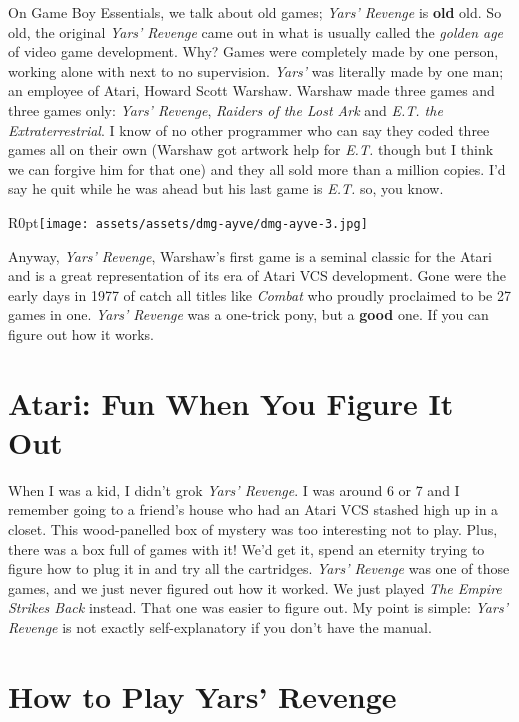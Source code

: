 \documentclass{book}
\begin{document}
On Game Boy Essentials, we talk about old games; \emph{Yars’ Revenge} is \textbf{old} old. So old, the original \emph{Yars’ Revenge} came out in what is usually called the \emph{golden age} of video game development. Why? Games were completely made by one person, working alone with next to no supervision. \emph{Yars’} was literally made by one man; an employee of Atari, Howard Scott Warshaw. Warshaw made three games and three games only: \emph{Yars’ Revenge}, \emph{Raiders of the Lost Ark} and \emph{E.T. the Extraterrestrial}. I know of no other programmer who can say they coded three games all on their own (Warshaw got artwork help for \emph{E.T.} though but I think we can forgive him for that one) and they all sold more than a million copies. I’d say he quit while he was ahead but his last game is \emph{E.T.} so, you know.\par
\begin{wrapfigure}{R}{0pt}{\texttt{[image: assets/assets/dmg-ayve/dmg-ayve-3.jpg]}}\end{wrapfigure}
Anyway, \emph{Yars’ Revenge}, Warshaw’s first game is a seminal classic for the Atari and is a great representation of its era of Atari VCS development. Gone were the early days in 1977 of catch all titles like \emph{Combat} who proudly proclaimed to be 27 games in one. \emph{Yars’ Revenge} was a one-trick pony, but a \textbf{good} one. If you can figure out how it works.\par
\FloatBarrier\section*{Atari: Fun When You Figure It Out}
When I was a kid, I didn’t grok \emph{Yars’ Revenge}. I was around 6 or 7 and I remember going to a friend’s house who had an Atari VCS stashed high up in a closet. This wood-panelled box of mystery was too interesting not to play. Plus, there was a box full of games with it! We’d get it, spend an eternity trying to figure how to plug it in and try all the cartridges. \emph{Yars’ Revenge} was one of those games, and we just never figured out how it worked. We just played \emph{The Empire Strikes Back} instead. That one was easier to figure out. My point is simple: \emph{Yars’ Revenge} is not exactly self-explanatory if you don’t have the manual.\par
\FloatBarrier\section*{How to Play Yars’ Revenge}
\end{document}

